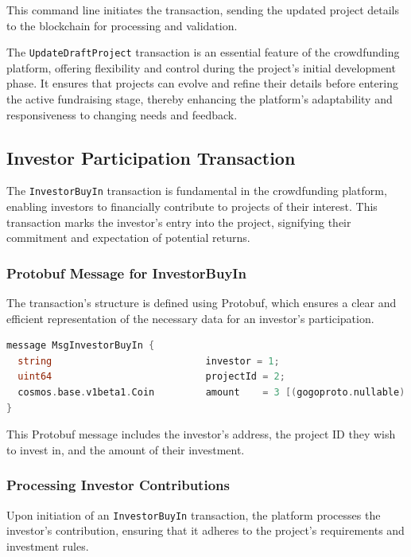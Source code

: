 This command line initiates the transaction, sending the updated project details to the blockchain for processing and validation.

The \texttt{UpdateDraftProject} transaction is an essential feature of the crowdfunding platform, offering flexibility and control during the project's initial development phase. It ensures that projects can evolve and refine their details before entering the active fundraising stage, thereby enhancing the platform's adaptability and responsiveness to changing needs and feedback.

\subsection{Investor Participation Transaction}

The \texttt{InvestorBuyIn} transaction is fundamental in the crowdfunding platform, enabling investors to financially contribute to projects of their interest. This transaction marks the investor's entry into the project, signifying their commitment and expectation of potential returns.

\subsubsection{Protobuf Message for InvestorBuyIn}

The transaction's structure is defined using Protobuf, which ensures a clear and efficient representation of the necessary data for an investor's participation.

\begin{lstlisting}[language=go, caption=InvestorBuyIn protobuf definition, label={lst:investor_buyin_proto}]
message MsgInvestorBuyIn {
  string                           investor = 1;
  uint64                           projectId = 2;
  cosmos.base.v1beta1.Coin         amount    = 3 [(gogoproto.nullable) = false];
}
\end{lstlisting}

This Protobuf message includes the investor's address, the project ID they wish to invest in, and the amount of their investment.

\subsubsection{Processing Investor Contributions}

Upon initiation of an \texttt{InvestorBuyIn} transaction, the platform processes the investor's contribution, ensuring that it adheres to the project's requirements and investment rules.

